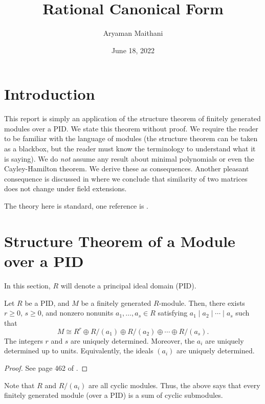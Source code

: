 \documentclass[12pt]{article}
\title{Rational Canonical Form}
\author{Aryaman Maithani}
\date{June 18, 2022}
\begin{document}
\maketitle

\section{Introduction}

This report is simply an application of the structure theorem of finitely generated modules over a PID. We state this theorem without proof. We require the reader to be familiar with the language of modules (the structure theorem can be taken as a blackbox, but the reader must know the terminology to understand what it is saying). \newline
We do \emph{not} assume any result about minimal polynomials or even the Cayley-Hamilton theorem. We derive these as consequences. Another pleasant consequence is discussed in  where we conclude that similarity of two matrices does not change under field extensions.

The theory here is standard, one reference is \cite{DF}.

\section{Structure Theorem of a Module over a PID}

In this section, $R$ will denote a principal ideal domain (PID). 

\begin{thm} \label{thm:structure-theorem}
	Let $R$ be a PID, and $M$ be a finitely generated $R$-module. Then, there exists $r \ge 0$, $s \ge 0$, and nonzero nonunits $a_{1}, \ldots, a_{s} \in R$ satisfying $a_{1} \mid a_{2} \mid \cdots \mid a_{s}$ such that
	\begin{equation*} 
		M \cong R^{r} \oplus R/(a_{1}) \oplus R/(a_{2}) \oplus \cdots \oplus R/(a_{s}).
	\end{equation*}
	The integers $r$ and $s$ are uniquely determined. Moreover, the $a_{i}$ are uniquely determined up to units. Equivalently, the ideals $(a_{i})$ are uniquely determined.
\end{thm}
\begin{proof} 
	See page 462 of \cite{DF}.
\end{proof}

Note that $R$ and $R/(a_{i})$ are all cyclic modules. Thus, the above says that every finitely generated module (over a PID) is a sum of cyclic submodules. 
\end{document}
